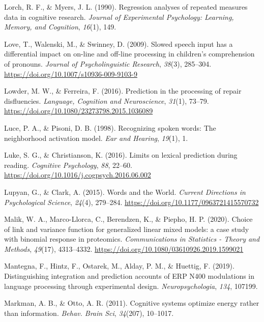 \documentclass[a4paper, nobind]{templates/ociamthesis}
\newlength{\cslhangindent}
\newenvironment{CSLReferences}[2] %
 {%
  \setlength{\parindent}{0pt}
  \ifodd #1
  \let\oldpar\par
  \def\par{\hangindent=\cslhangindent\oldpar}
  \fi
  \setlength{\parskip}{1mm}
  \setlength{\baselineskip}{6mm}
 }%
 {}
\begin{document}
\begin{CSLReferences}{1}{0}
\leavevmode{}%
Lorch, R. F., \& Myers, J. L. (1990). Regression analyses of repeated measures data in cognitive research. \emph{Journal of Experimental Psychology: Learning, Memory, and Cognition}, \emph{16}(1), 149.

\leavevmode{}%
Love, T., Walenski, M., \& Swinney, D. (2009). {Slowed speech input has a differential impact on on-line and off-line processing in children's comprehension of pronouns}. \emph{Journal of Psycholinguistic Research}, \emph{38}(3), 285--304. \url{https://doi.org/10.1007/s10936-009-9103-9}

\leavevmode{}%
Lowder, M. W., \& Ferreira, F. (2016). {Prediction in the processing of repair disfluencies}. \emph{Language, Cognition and Neuroscience}, \emph{31}(1), 73--79. \url{https://doi.org/10.1080/23273798.2015.1036089}

\leavevmode{}%
Luce, P. A., \& Pisoni, D. B. (1998). Recognizing spoken words: The neighborhood activation model. \emph{Ear and Hearing}, \emph{19}(1), 1.

\leavevmode{}%
Luke, S. G., \& Christianson, K. (2016). Limits on lexical prediction during reading. \emph{Cognitive Psychology}, \emph{88}, 22--60. \url{https://doi.org/10.1016/j.cogpsych.2016.06.002}

\leavevmode{}%
Lupyan, G., \& Clark, A. (2015). Words and the World. \emph{Current Directions in Psychological Science}, \emph{24}(4), 279--284. \url{https://doi.org/10.1177/0963721415570732}

\leavevmode{}%
Malik, W. A., Marco-Llorca, C., Berendzen, K., \& Piepho, H. P. (2020). {Choice of link and variance function for generalized linear mixed models: a case study with binomial response in proteomics}. \emph{Communications in Statistics - Theory and Methods}, \emph{49}(17), 4313--4332. \url{https://doi.org/10.1080/03610926.2019.1599021}

\leavevmode{}%
Mantegna, F., Hintz, F., Ostarek, M., Alday, P. M., \& Huettig, F. (2019). Distinguishing integration and prediction accounts of ERP N400 modulations in language processing through experimental design. \emph{Neuropsychologia}, \emph{134}, 107199.

\leavevmode{}%
Markman, A. B., \& Otto, A. R. (2011). Cognitive systems optimize energy rather than information. \emph{Behav. Brain Sci}, \emph{34}(207), 10--1017.


\end{CSLReferences}
\end{document}
